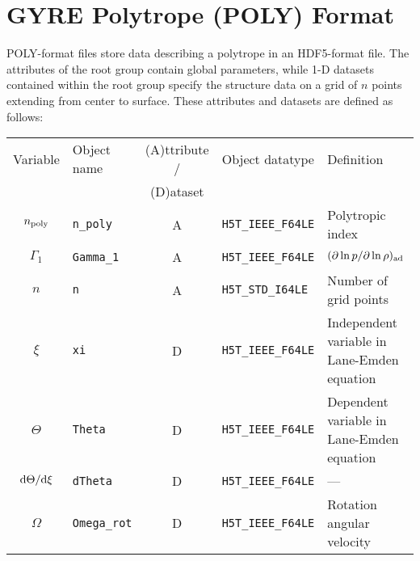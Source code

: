 \documentclass{article}
\newcommand{\diff}{\ensuremath{{\rm d}}}
\begin{document}
\section*{GYRE Polytrope (POLY) Format}

POLY-format files store data describing a polytrope in an
HDF5-format file. The attributes of the root group contain global
parameters, while 1-D datasets contained within the root group
specify the structure data on a grid of $n$ points extending from
center to surface. These attributes and datasets are defined as
follows:

\begin{table}[h!]
\begin{tabular}{|c|l|c|l|l|} \hline
Variable      & Object name       & (A)ttribute / & Object datatype & Definition \\
              &                   & (D)ataset     &                 &            \\ \hline
$n_{\rm poly}$ & \texttt{n\_poly}  & A & \texttt{H5T\_IEEE\_F64LE} & Polytropic index \\
$\Gamma_{1}$  & \texttt{Gamma\_1} & A & \texttt{H5T\_IEEE\_F64LE} & $(\partial \ln p/\partial \ln \rho)_{\rm ad}$ \\
$n$          & \texttt{n}        & A &\texttt{H5T\_STD\_I64LE}   & Number of grid points \\ 
$\xi$        & \texttt{xi}       & D & \texttt{H5T\_IEEE\_F64LE} & Independent variable in Lane-Emden equation \\
$\Theta$     & \texttt{Theta}    & D & \texttt{H5T\_IEEE\_F64LE} & Dependent variable in Lane-Emden equation \\
$\diff\Theta/\diff \xi$  & \texttt{dTheta}   & D & \texttt{H5T\_IEEE\_F64LE} & --- \\
$\Omega$     & \texttt{Omega\_rot} & D & \texttt{H5T\_IEEE\_F64LE} & Rotation angular velocity \\ \hline
\end{tabular}
\end{table}
\end{document}
